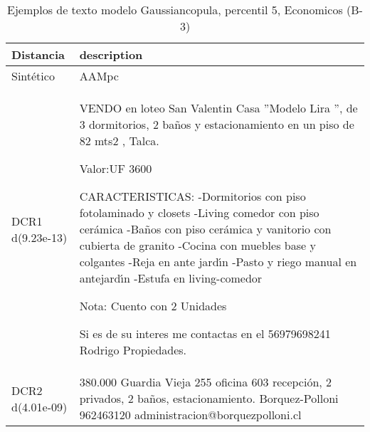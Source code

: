 \begin{table}[H]
\centering
\fontsize{10}{14}\selectfont
\caption{Ejemplos de texto modelo Gaussiancopula, percentil 5, Economicos (B-3)}
\label{table-example-economicos-b-3-gaussiancopula-5p-text}
\begin{tabular}{|l|m{35em}|}
\hline
\rowcolor[gray]{0.8}
Distancia & description \\
\hline Sintético & AAMpc \\
\hline DCR1 d(9.23e-13) & VENDO en loteo San Valentin Casa ''Modelo Lira '', de 3 dormitorios, 2 ba\~nos y estacionamiento en un piso de 82 mts2 , Talca.

Valor:UF 3600

CARACTERISTICAS:
-Dormitorios con piso fotolaminado y closets
-Living comedor con piso cer\'amica
-Ba\~nos con piso cer\'amica y vanitorio con cubierta de granito
-Cocina con muebles base y colgantes
-Reja en ante jard{\'\i}n
-Pasto y riego manual en antejard{\'\i}n
-Estufa en living-comedor
 

Nota: Cuento con 2 Unidades

Si es de su interes me contactas en el 56979698241 Rodrigo Propiedades. \\
\hline DCR2 d(4.01e-09) & 380.000 Guardia Vieja 255 oficina 603 recepci\'on, 2 privados, 2 ba\~nos, estacionamiento. Borquez-Polloni 962463120 administracion@borquezpolloni.cl \\
\hline
\end{tabular}
\end{table}
